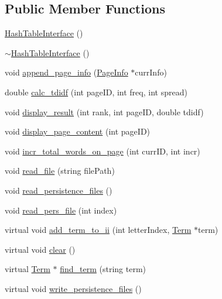 \subsection*{Public Member Functions}
\begin{DoxyCompactItemize}
\item 
\hyperlink{class_hash_table_interface_afcc090bbeda66c331a7a28623aad5d0c}{Hash\+Table\+Interface} ()
\item 
\hyperlink{class_hash_table_interface_ab0a34d3f1ee275590002fc4c5d4327fe}{$\sim$\+Hash\+Table\+Interface} ()
\item 
void \hyperlink{class_index_interface_a7f082789ce91eaaacc10a5c841b62cd4}{append\+\_\+page\+\_\+info} (\hyperlink{class_page_info}{Page\+Info} $\ast$curr\+Info)
\item 
double \hyperlink{class_index_interface_a8195aee88cd593c2e6ca2e2c48cbd068}{calc\+\_\+tdidf} (int page\+I\+D, int freq, int spread)
\item 
void \hyperlink{class_index_interface_a7e4d5fe8c31cfc9aa02c2dd1d7e1d3aa}{display\+\_\+result} (int rank, int page\+I\+D, double tdidf)
\item 
void \hyperlink{class_index_interface_a3d784385e028557312ef15d59574f9ed}{display\+\_\+page\+\_\+content} (int page\+I\+D)
\item 
void \hyperlink{class_index_interface_a5734b1488a787d47984bf97ffa5aff8d}{incr\+\_\+total\+\_\+words\+\_\+on\+\_\+page} (int curr\+I\+D, int incr)
\item 
void \hyperlink{class_index_interface_a229f1eb93f38d85d78e64e579c46c98a}{read\+\_\+file} (string file\+Path)
\item 
void \hyperlink{class_index_interface_aebcf89c2fd27b815b697c8e9d29e0c3a}{read\+\_\+persistence\+\_\+files} ()
\item 
void \hyperlink{class_index_interface_a0ca6250b71da3983ca31afdf3ee6dd88}{read\+\_\+pers\+\_\+file} (int index)
\item 
virtual void \hyperlink{class_index_interface_aa83b7083d107869e3519c5862bc71d0a}{add\+\_\+term\+\_\+to\+\_\+ii} (int letter\+Index, \hyperlink{class_term}{Term} $\ast$term)
\item 
virtual void \hyperlink{class_index_interface_ad7b88501f360ccfad0c1ee08d793ca25}{clear} ()
\item 
virtual \hyperlink{class_term}{Term} $\ast$ \hyperlink{class_index_interface_a851f0396f0b390cc9aa8cde270afffc9}{find\+\_\+term} (string term)
\item 
virtual void \hyperlink{class_index_interface_a0b4ec5fcc32c08959cffad3a3141dd4e}{write\+\_\+persistence\+\_\+files} ()

\end{DoxyCompactItemize}
